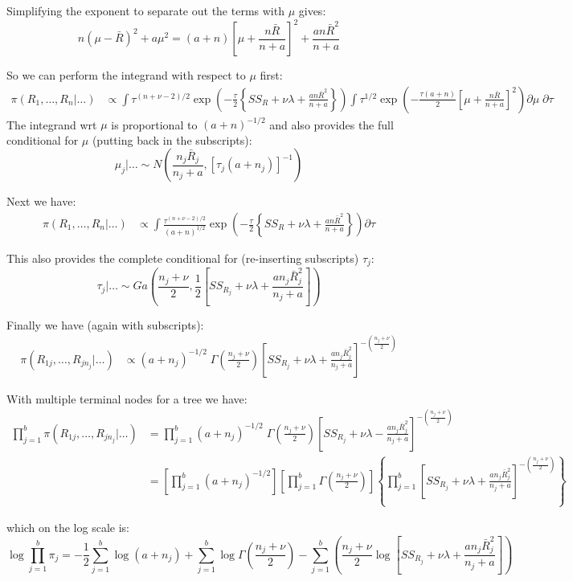 \documentclass{article}
\begin{document}
Simplifying the exponent to separate out the terms with $\mu$ gives:
$$n(\mu - \bar{R})^2 + a \mu^2 = (a+n)\left[ \mu + \frac{n\bar{R}}{n + a} \right]^2 + \frac{a n\bar{R}^2}{n + a}$$

So we can perform the integrand with respect to $\mu$ first:
\begin{align*}
\pi(R_1, \ldots, R_n| \ldots ) &\propto  \int  \tau^{(n+\nu - 2)/2} \exp \left(-\frac{\tau}{2} \left\{ SS_{R} + \nu \lambda + \frac{an\bar{R}^2}{n + a} \right\} \right) \int \tau^{1/2} \exp \left(-\frac{\tau (a+n)}{2} \left[ \mu + \frac{n\bar{R}}{n + a} \right]^2  \right) \partial \mu \; \partial \tau
\end{align*}
The integrand wrt $\mu$ is proportional to $(a + n)^{-1/2}$ and also provides the full conditional for $\mu$ (putting back in the subscripts):
$$\mu_j |\ldots \sim N \left( \frac{n_j\bar{R}_j}{n_j + a} , \left[ \tau_j (a+n_j) \right]^{-1} \right)$$

Next we have: 
\begin{align*}
\pi(R_1, \ldots, R_n| \ldots ) &\propto  \int  \frac{\tau^{(n+\nu - 2)/2}}{(a+n)^{1/2}} \exp \left(-\frac{\tau}{2} \left\{ SS_{R} + \nu \lambda + \frac{an\bar{R}^2}{n + a} \right\} \right)  \partial \tau
\end{align*}

This also provides the complete conditional for (re-inserting subscripts) $\tau_j$:
$$\tau_j |\ldots \sim Ga \left( \frac{n_j + \nu}{2} , \frac{1}{2} \left[ SS_{R_j} + \nu \lambda + \frac{an_j\bar{R}_j^2}{n_j+a} \right] \right)$$

Finally we have (again with subscripts):
\begin{align*}
\pi(R_{1j}, \ldots, R_{jn_j}| \ldots ) &\propto (a+n_j)^{-1/2} \; \Gamma \left( \frac{n_j + \nu}{2} \right) \left[SS_{R_j} + \nu \lambda + \frac{an_j\bar{R}_j^2}{n_j + a} \right]^{-\left( \frac{n_j + \nu}{2} \right)}
\end{align*}

With multiple terminal nodes for a tree we have:
\begin{align*}
\prod_{j=1}^b \pi(R_{1j}, \ldots, R_{jn_j}| \ldots ) &= \prod_{j=1}^b (a+n_j)^{-1/2} \; \Gamma \left( \frac{n_j + \nu}{2} \right) \left[SS_{R_j} + \nu \lambda - \frac{an_j\bar{R}_j^2}{n_j + a} \right]^{-(\frac{n_j + \nu}{2})} \\
&= \left[ \prod_{j=1}^b (a+n_j)^{-1/2} \right] \left[ \prod_{j=1}^b \Gamma \left( \frac{n_j + \nu}{2} \right) \right] \left\{ \prod_{j=1}^b \left[SS_{R_j} + \nu \lambda + \frac{an_j\bar{R}_j^2}{n_j + a} \right]^{-\left( \frac{n_j + \nu}{2} \right)} \right\}
\end{align*}

which on the log scale is:
$$\log \prod_{j=1}^b \pi_j = -\frac{1}{2} \sum_{j=1}^b \log(a + n_j) + \sum_{j=1}^b \log \Gamma \left( \frac{n_j + \nu}{2} \right) - \sum_{j=1}^b \left( \frac{n_j + \nu}{2} \log \left[SS_{R_j} + \nu \lambda + \frac{an_j\bar{R}_j^2}{n_j + a} \right] \right) $$
\end{document}
